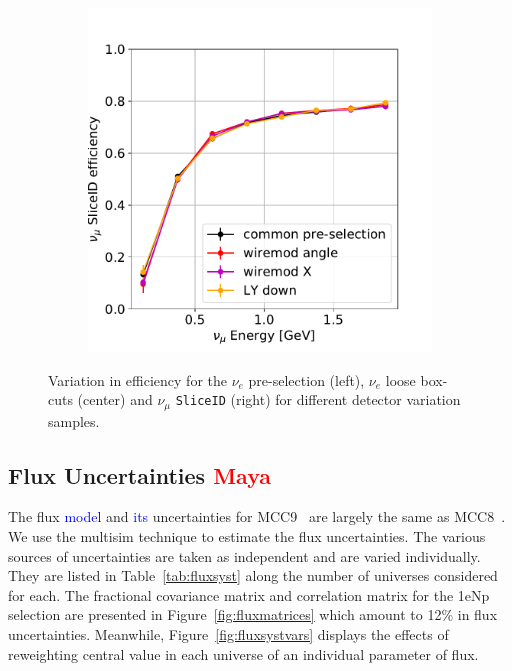 \documentclass[a4paper]{article}
\begin{document}
\begin{figure}[H]
\begin{center}
\begin{subfigure}[b]{0.3\textwidth}
    \end{subfigure}
    \begin{subfigure}[b]{0.3\textwidth}
    \centering
    \includegraphics[width=1.00\textwidth]{detsys/nu_e01162020_numu_slice_eff.pdf}
    \end{subfigure}
\caption{\label{fig:detsys:dedx:eLEElow}Variation in efficiency for the $\nu_e$ pre-selection (left), $\nu_e$ loose box-cuts (center) and $\nu_{\mu}$ \texttt{SliceID} (right) for different detector variation samples.}
\end{center}
\end{figure}

\subsection{Flux Uncertainties \textcolor{red}{Maya}}
The flux \textcolor{blue}{model} and \textcolor{blue}{its} uncertainties for MCC9~\cite{bib:fluxmcc9,bib:fluxtechnote} are largely the same as MCC8~\cite{bib:fluxtechnote}. We use the multisim technique to estimate the flux uncertainties. The various sources of uncertainties are taken as independent and are varied individually. They are listed in Table~\ref{tab:fluxsyst} along the number of universes considered for each. The fractional covariance matrix and correlation matrix for the 1eNp selection are presented in Figure~\ref{fig:fluxmatrices} which amount to 12\% in flux uncertainties. Meanwhile, Figure~\ref{fig:fluxsystvars} displays the effects of reweighting central value in each universe of an individual parameter of flux.
\end{document}
